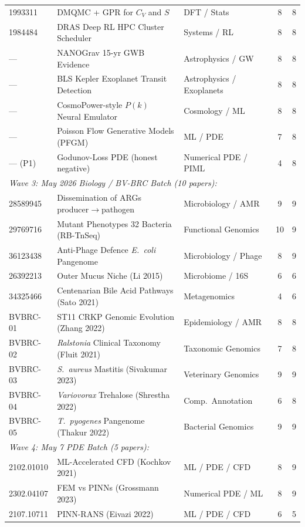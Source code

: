 \documentclass[11pt]{article}
\begin{document}
\begin{longtable}{lllcc}
1993311 & DMQMC + GPR for $C_V$ and $S$ & DFT / Stats & 8 & 8 \\
1984484 & DRAS Deep RL HPC Cluster Scheduler & Systems / RL & 8 & 8 \\
— & NANOGrav 15-yr GWB Evidence & Astrophysics / GW & 8 & 8 \\
— & BLS Kepler Exoplanet Transit Detection & Astrophysics / Exoplanets & 8 & 8 \\
— & CosmoPower-style $P(k)$ Neural Emulator & Cosmology / ML & 8 & 8 \\
— & Poisson Flow Generative Models (PFGM) & ML / PDE & 7 & 8 \\
— (P1) & Godunov-Loss PDE (honest negative) & Numerical PDE / PIML & 4 & 8 \\
\midrule
\multicolumn{3}{l}{\textit{Wave 3: May 2026 Biology / BV-BRC Batch (10 papers):}} & & \\
28589945 & Dissemination of ARGs producer$\to$pathogen & Microbiology / AMR & 9 & 9 \\
29769716 & Mutant Phenotypes 32 Bacteria (RB-TnSeq) & Functional Genomics & 10 & 9 \\
36123438 & Anti-Phage Defence \textit{E.\ coli} Pangenome & Microbiology / Phage & 8 & 9 \\
26392213 & Outer Mucus Niche (Li 2015) & Microbiome / 16S & 6 & 6 \\
34325466 & Centenarian Bile Acid Pathways (Sato 2021) & Metagenomics & 4 & 6 \\
BVBRC-01 & ST11 CRKP Genomic Evolution (Zhang 2022) & Epidemiology / AMR & 8 & 8 \\
BVBRC-02 & \textit{Ralstonia} Clinical Taxonomy (Fluit 2021) & Taxonomic Genomics & 7 & 8 \\
BVBRC-03 & \textit{S.\ aureus} Mastitis (Sivakumar 2023) & Veterinary Genomics & 9 & 9 \\
BVBRC-04 & \textit{Variovorax} Trehalose (Shrestha 2022) & Comp.\ Annotation & 6 & 8 \\
BVBRC-05 & \textit{T.\ pyogenes} Pangenome (Thakur 2022) & Bacterial Genomics & 9 & 9 \\
\midrule
\multicolumn{3}{l}{\textit{Wave 4: May 7 PDE Batch (5 papers):}} & & \\
2102.01010 & ML-Accelerated CFD (Kochkov 2021) & ML / PDE / CFD & 8 & 9 \\
2302.04107 & FEM vs PINNs (Grossmann 2023) & Numerical PDE / ML & 8 & 9 \\
2107.10711 & PINN-RANS (Eivazi 2022) & ML / PDE / CFD & 6 & 5 \\

\end{longtable}
\end{document}
